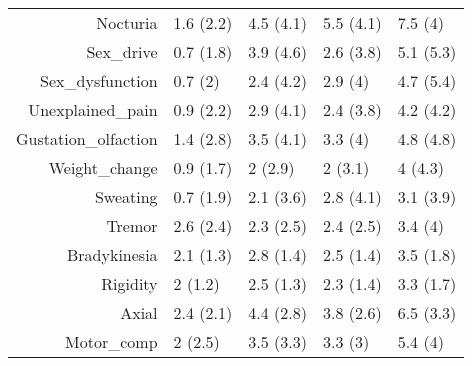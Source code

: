 \begin{table}[ht]
\begin{tabular}{rllll}
  Nocturia & 1.6 (2.2) & 4.5 (4.1) & 5.5 (4.1) & 7.5 (4) \\ 
  Sex\_drive & 0.7 (1.8) & 3.9 (4.6) & 2.6 (3.8) & 5.1 (5.3) \\ 
  Sex\_dysfunction & 0.7 (2) & 2.4 (4.2) & 2.9 (4) & 4.7 (5.4) \\ 
  Unexplained\_pain & 0.9 (2.2) & 2.9 (4.1) & 2.4 (3.8) & 4.2 (4.2) \\ 
  Gustation\_olfaction & 1.4 (2.8) & 3.5 (4.1) & 3.3 (4) & 4.8 (4.8) \\ 
  Weight\_change & 0.9 (1.7) & 2 (2.9) & 2 (3.1) & 4 (4.3) \\ 
  Sweating & 0.7 (1.9) & 2.1 (3.6) & 2.8 (4.1) & 3.1 (3.9) \\ 
  Tremor & 2.6 (2.4) & 2.3 (2.5) & 2.4 (2.5) & 3.4 (4) \\ 
  Bradykinesia & 2.1 (1.3) & 2.8 (1.4) & 2.5 (1.4) & 3.5 (1.8) \\ 
  Rigidity & 2 (1.2) & 2.5 (1.3) & 2.3 (1.4) & 3.3 (1.7) \\ 
  Axial & 2.4 (2.1) & 4.4 (2.8) & 3.8 (2.6) & 6.5 (3.3) \\ 
  Motor\_comp & 2 (2.5) & 3.5 (3.3) & 3.3 (3) & 5.4 (4) \\ 
   \bottomrule
\end{tabular}
\end{table}
